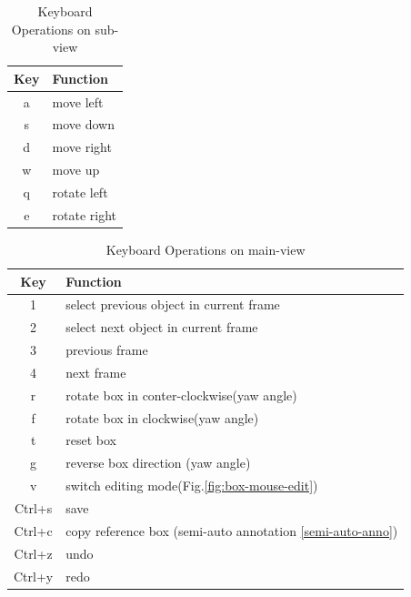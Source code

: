 \documentclass[letterpaper, 10 pt, conference]{ieeeconf}  %
\begin{document}
\begin{table}[ht]
	\caption{Keyboard Operations on sub-view}
	\label{table_keyboard_subview}
	\begin{center}
		\begin{tabular}{|c|l|}
			\hline
			\textbf{Key} & \textbf{Function}\\			
			\hline
			a & move left\\
			\hline
			s & move down\\
			\hline
			d & move right\\
			\hline
			w & move up\\
			\hline
			q & rotate left\\
			\hline
			e & rotate right\\
			\hline
		\end{tabular}
	\end{center}
\end{table}

\begin{table}[ht]
	\caption{Keyboard Operations on main-view}
	\label{table_keyboard_mainview}
	\begin{center}
		\begin{tabular}{|c|l|}
			\hline
			\textbf{Key} & \textbf{Function}\\
			\hline
			1 & select previous object in current frame\\
			\hline
			2 & select next object in current frame\\
			\hline
			3 & previous frame\\
			\hline
			4 & next frame\\
			\hline
			r & rotate box in conter-clockwise(yaw angle)\\
			\hline
			f & rotate box in clockwise(yaw angle)\\
			\hline
			t & reset box\\
			\hline
			g & reverse box direction (yaw angle)\\
			\hline
			v & switch editing mode(Fig.\ref{fig:box-mouse-edit})\\
			\hline
			Ctrl+s & save\\
			\hline
			Ctrl+c & copy reference box (semi-auto annotation \ref{semi-auto-anno})\\
			\hline
			Ctrl+z & undo\\
			\hline
			Ctrl+y & redo\\
			\hline
		\end{tabular}
	\end{center}
\end{table}
\end{document}
